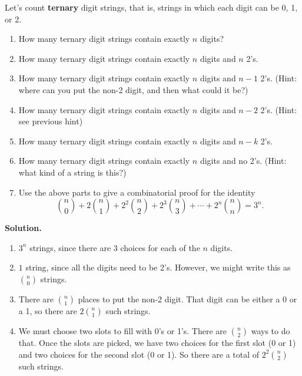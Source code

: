 \documentclass[10pt,]{book}
\newcommand{\terminology}[1]{\textbf{#1}}
\theoremstyle{plain}
\theoremstyle{definition}
\theoremstyle{definition}
\theoremstyle{definition}
\numberwithin{equation}{section}
\begin{document}
\begin{exerciselist}
          Let's count \terminology{ternary} digit strings, that is, strings in which each digit can be 0, 1, or 2.
\leavevmode%
\begin{enumerate}[label=(\alph*)]
\item\hypertarget{li-543}{} How many ternary digit strings contain exactly \(n\) digits? %
\item\hypertarget{li-544}{} How many ternary digit strings contain exactly \(n\) digits and \(n\) 2's. %
\item\hypertarget{li-545}{} How many ternary digit strings contain exactly \(n\) digits and \(n-1\) 2's.  (Hint: where can you put the non-2 digit, and then what could it be?) %
\item\hypertarget{li-546}{} How many ternary digit strings contain exactly \(n\) digits and \(n-2\) 2's.  (Hint: see previous hint) %
\item\hypertarget{li-547}{} How many ternary digit strings contain exactly \(n\) digits and \(n-k\) 2's. %
\item\hypertarget{li-548}{} How many ternary digit strings contain exactly \(n\) digits and no 2's. (Hint: what kind of a string is this?) %
\item\hypertarget{li-549}{} Use the above parts to give a combinatorial proof for the identity \begin{equation*} {n \choose 0} + 2{n \choose 1} + 2^2{n \choose 2} + 2^3{n \choose 3} + \cdots + 2^n{n \choose n} = 3^n. \end{equation*} %
\end{enumerate}
\par\smallskip
\par\smallskip
\noindent\textbf{Solution.}\hypertarget{solution-115}{}\quad
\leavevmode%
\begin{enumerate}[label=(\alph*)]
\item\hypertarget{li-550}{}\(3^n\) strings, since there are 3 choices for each of the \(n\) digits.%
\item\hypertarget{li-551}{}\(1\) string, since all the digits need to be 2's.  However, we might write this as \({n \choose 0}\) strings.%
\item\hypertarget{li-552}{} There are \({n \choose 1}\) places to put the non-2 digit.  That digit can be either a 0 or a 1, so there are \(2{n \choose 1}\) such strings. %
\item\hypertarget{li-553}{} We must choose two slots to fill with 0's or 1's.  There are \({n \choose 2}\) ways to do that.  Once the slots are picked, we have two choices for the first slot (0 or 1) and two choices for the second slot (0 or 1).  So there are a total of \(2^2{n \choose 2}\) such strings. %

\end{enumerate}
\end{exerciselist}
\end{document}
